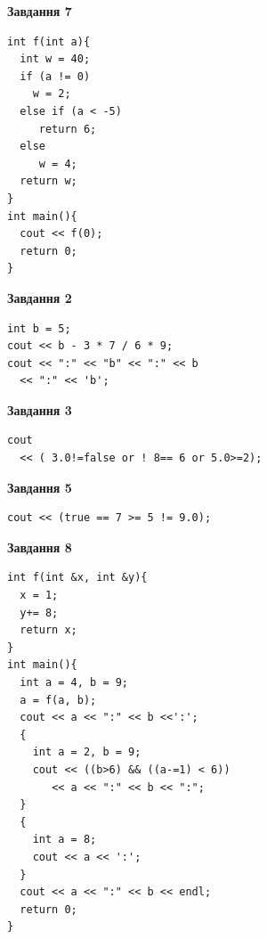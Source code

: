 \documentclass[12pt, ukrainian]{article}
\begin{document}
{\begin {large}
\begin{minipage}[t]{7.0cm}
\begin{center}
\textbf{Завдання 7}
\end{center}
\vspace{-8mm}

\begin{verbatim}
int f(int a){
  int w = 40;
  if (a != 0)
    w = 2;
  else if (a < -5)
     return 6;
  else
     w = 4;
  return w;
}
int main(){
  cout << f(0);
  return 0;
}
\end{verbatim}

\end{minipage}
\vline \hspace{1mm}
\begin{minipage}[t]{11.0cm}

\begin{center}
\textbf{Завдання 2}
\end{center}
\vspace{-8mm}

\begin{verbatim}
int b = 5;
cout << b - 3 * 7 / 6 * 9;
cout << ":" << "b" << ":" << b 
  << ":" << 'b';
\end{verbatim}



\begin{center}
\textbf{Завдання 3}
\end{center}
\vspace{-8mm}

\begin{verbatim}
cout 
  << ( 3.0!=false or ! 8== 6 or 5.0>=2);
\end{verbatim}



\begin{center}
\textbf{Завдання 5}
\end{center}
\vspace{-8mm}

\begin{verbatim}
cout << (true == 7 >= 5 != 9.0);
\end{verbatim}



\begin{center}
\textbf{Завдання 8}
\end{center}
\vspace{-8mm}

\begin{verbatim}
int f(int &x, int &y){
  x = 1;
  y+= 8;
  return x;
}
int main(){
  int a = 4, b = 9;
  a = f(a, b);
  cout << a << ":" << b <<':';
  {
    int a = 2, b = 9;
    cout << ((b>6) && ((a-=1) < 6))
       << a << ":" << b << ":";
  }
  {
    int a = 8;
    cout << a << ':';
  }
  cout << a << ":" << b << endl;
  return 0;
}
\end{verbatim}


\end{minipage}
\end{large}}
\end{document}
